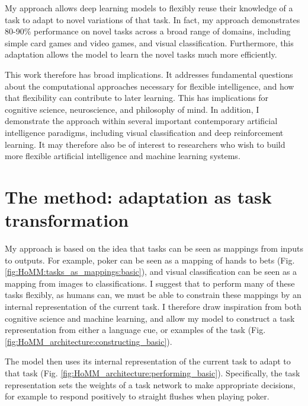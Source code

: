 \documentclass[12pt]{article}
\begin{document}
My approach allows deep learning models to flexibly reuse their knowledge of a task to adapt to novel variations of that task. In fact, my approach demonstrates 80-90\% performance on novel tasks across a broad range of domains, including simple card games and video games, and visual classification. Furthermore, this adaptation allows the model to learn the novel tasks much more efficiently.  

This work therefore has broad implications. It addresses fundamental questions about the computational approaches necessary for flexible intelligence, and how that flexibility can contribute to later learning. This has implications for cognitive science, neuroscience, and philosophy of mind. In addition, I demonstrate the approach within several important contemporary artificial intelligence paradigms, including visual classification and deep reinforcement learning. It may therefore also be of interest to researchers who wish to build more flexible artificial intelligence and machine learning systems.

\section{The method: adaptation as task transformation}

My approach is based on the idea that tasks can be seen as mappings from inputs to outputs. For example, poker can be seen as a mapping of hands to bets (Fig. \ref{fig:HoMM:tasks_as_mappings:basic}), and visual classification can be seen as a mapping from images to classifications. I suggest that to perform many of these tasks flexibly, as humans can, we must be able to constrain these mappings by an internal representation of the current task. I therefore draw inspiration from both cognitive science and machine learning, and allow my model to construct a task representation from either a language cue, or examples of the task (Fig. \ref{fig:HoMM_architecture:constructing_basic}). 

The model then uses its internal representation of the current task to adapt to that task (Fig. \ref{fig:HoMM_architecture:performing_basic}). Specifically, the task representation sets the weights of a task network to make appropriate decisions, for example to respond positively to straight flushes when playing poker. 
\end{document}
